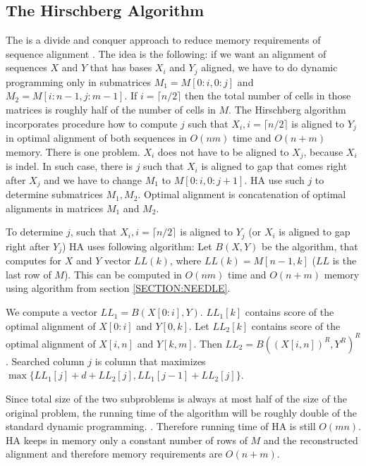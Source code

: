  
\subsection{The Hirschberg Algorithm}

The  is a divide and conquer approach to reduce
memory requirements of sequence alignment \cite{Hirschberg1975}. The idea is
the following: if we want an alignment of sequences $X$ and $Y$ that has bases $X_i$
and $Y_j$ aligned, we have to  do dynamic programming only in submatrices
$M_1=M[0:i,0:j]$ and $M_2=M[i:n-1,j:m-1]$. If $i=\lceil n/2\rceil$ then
the total number of cells in those matrices is roughly half of the number of
cells in $M$. The Hirschberg algorithm incorporates procedure how to compute 
$j$ such that $X_i, i=\lceil n/2\rceil$ is aligned to $Y_j$ in optimal alignment of both sequences in $O(nm)$
time and $O(n+m)$ memory. There is one problem. $X_i$ does not have to
be aligned to $X_j$, because $X_i$ is indel. In such case, there is $j$ such
that $X_i$ is aligned to gap that comes right after $X_j$ and we have to change
$M_1$ to $M[0:i,0:j+1]$. HA use such $j$ to determine submatrices $M_1,M_2$.
Optimal alignment is concatenation of optimal alignments in matrices $M_1$ and
$M_2$.

To determine $j$, such that $X_i,i=\lceil n/2\rceil$ is aligned to $Y_j$ (or
$X_i$ is aligned to gap right after $Y_j$) HA uses following algorithm: Let
$B(X,Y)$ be the algorithm, that computes for $X$ and $Y$ vector $LL(k)$, where
$LL(k)=M[n-1,k]$ ($LL$ is the last row of $M$). This can be computed in
$O(nm)$ time and $O(n+m)$ memory using algorithm from section
\ref{SECTION:NEEDLE}.  

We compute a vector $LL_1=B(X[0:i],Y)$. $LL_1[k]$ contains score of the optimal
alignment of $X[0:i]$ and $Y[0,k]$. Let $LL_2[k]$ contains score of the optimal
alignment of $X[i,n]$ and $Y[k,m]$. Then $LL_2=B( (X[i,n])^R,Y^R)^R$.
Searched column $j$ is column that maximizes $\max\{LL_1[j]+d+LL_2[j],
LL_1[j-1]+LL_2[j] \}$.

Since total size of the two subproblems is always at most half of the size of the
original problem, the running time of the algorithm will be roughly double of
the standard dynamic programming.
. Therefore
running time of HA is still $O(mn)$. HA keeps in memory only a constant number
of rows of $M$ and the reconstructed alignment and therefore memory requirements are
$O(n+m)$.


